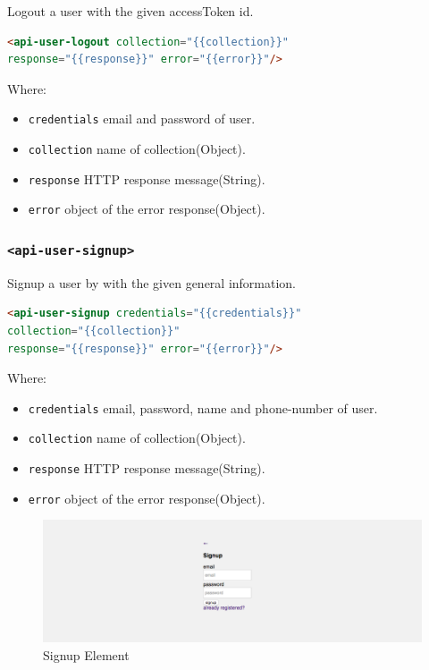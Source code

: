 Logout a user with the given accessToken id.
\begin{lstlisting}[language=html]
<api-user-logout collection="{{collection}}" 
response="{{response}}" error="{{error}}"/>
\end{lstlisting}
Where:
\begin{itemize}
\item \texttt{credentials} email and password of user.
\item \texttt{collection} name of collection(Object).
\item \texttt{response}	HTTP response message(String).
\item \texttt{error} object of the error response(Object).
\end{itemize}

\subsubsection{\texttt{<api-user-signup>}}

Signup a user by with the given general information.
\begin{lstlisting}[language=html]
<api-user-signup credentials="{{credentials}}"
collection="{{collection}}" 
response="{{response}}" error="{{error}}"/>
\end{lstlisting}
Where:
\begin{itemize}
\item \texttt{credentials} email, password, name and phone-number of user.
\item \texttt{collection} name of collection(Object).
\item \texttt{response}	HTTP response message(String).
\item \texttt{error} object of the error response(Object).
\end{itemize}

\begin {figure}[h]
\graphicspath{{images/chapter_USR/}}
\includegraphics[width=\textwidth]{usr4}
\caption{Signup Element}
\end {figure}

